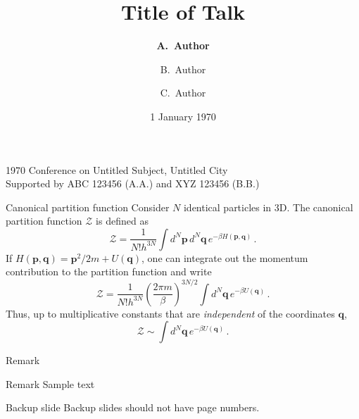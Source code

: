 \documentclass[noamssymb,noamsmath,aspectratio=169]{beamer}
\title{Title of Talk}
\author{\texorpdfstring{\textbf{A.~Author}}{A.~Author} \and B.~Author \and C.~Author}
\institute{Untitled Department, Untitled Institute}
\date{1 January 1970}
\begin{document}
\begin{frame}
  \titlepage
  \begin{center}
    {\small 1970 Conference on Untitled Subject, Untitled City\\[\baselineskip]}
    {\footnotesize Supported by ABC 123456 (A.A.) and XYZ 123456 (B.B.)}
  \end{center}
\end{frame}

\begin{frame}{Canonical partition function}
Consider $N$ identical particles in 3D.
The canonical partition function $\mathcal{Z}$ is defined as
\begin{equation}
  \mathcal{Z} = \frac{1}{N! h^{3N}}\int d^{N}\mathbf{p}\, d^{N}\mathbf{q}\, e^{-\beta H(\mathbf{p},\mathbf{q})}\,.
\end{equation}
%
If $H(\mathbf{p},\mathbf{q}) = \mathbf{p}^2/2m + U(\mathbf{q})$, one can integrate out the momentum contribution to the partition function and write
\begin{equation}
  \mathcal{Z} = \frac{1}{N! h^{3N}}\left(\frac{2\pi m}{\beta}\right)^{3N/2}\int d^{N}\mathbf{q}\, e^{-\beta U(\mathbf{q})}\,.
\end{equation}
%
Thus, up to multiplicative constants that are \emph{independent} of the coordinates $\mathbf{q}$,
\begin{equation}
  \mathcal{Z} \sim \int d^{N}\mathbf{q}\, e^{-\beta U(\mathbf{q})}\,.
\end{equation}
\end{frame}

\begin{frame}{Remark}

\begin{block}{Remark}
Sample text
\end{block}

\end{frame}

\begin{frame}{Backup slide}
  Backup slides should not have page numbers.
\end{frame}
\end{document}
